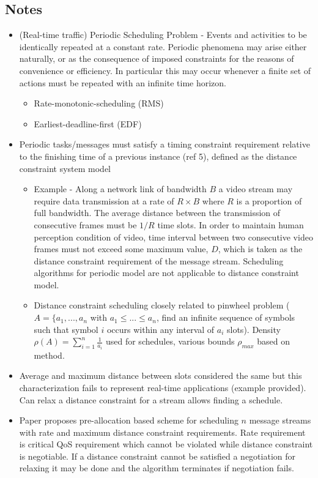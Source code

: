\documentclass{article}
\begin{document}
\subsection{Notes}
\begin{itemize}
    \item (Real-time traffic) Periodic Scheduling Problem - Events and activities to be identically repeated at a constant rate.  Periodic phenomena may arise either naturally, or as the consequence of imposed constraints for the reasons of convenience or efficiency.  In particular this may occur whenever a finite set of actions must be repeated with an infinite time horizon.
    \begin{itemize}
        \item Rate-monotonic-scheduling (RMS)
        \item Earliest-deadline-first (EDF)
    \end{itemize}
    \item Periodic tasks/messages must satisfy a timing constraint requirement relative to the finishing time of a previous instance (ref 5), defined as the distance constraint system model
    \begin{itemize}
        \item Example - Along a network link of bandwidth $B$ a video stream may require data transmission at a rate of $R \times B$ where $R$ is a proportion of full bandwidth.  The average distance between the transmission of consecutive frames must be $1/R$ time slots.  In order to maintain human perception condition of video, time interval between two consecutive video frames must not exceed some maximum value, $D$, which is taken as the distance constraint requirement of the message stream.  Scheduling algorithms for periodic model are not applicable to distance constraint model.
        \item Distance constraint scheduling closely related to pinwheel problem ($A=\{a_1,...,a_n$ with $a_1 \leq ... \leq a_n$, find an infinite sequence of symbols such that symbol $i$ occurs within any interval of $a_i$ slots).  Density $\rho(A)=\sum_{i=1}^n \frac{1}{a_i}$ used for schedules, various bounds $\rho_{max}$ based on method.
    \end{itemize}
    \item Average and maximum distance between slots considered the same but this characterization fails to represent real-time applications (example provided).  Can relax a distance constraint for a stream allows finding a schedule.
    \item Paper proposes pre-allocation based scheme for scheduling $n$ message streams with rate and maximum distance constraint requirements.  Rate requirement is critical QoS requirement which cannot be violated while distance constraint is negotiable.  If a distance constraint cannot be satisfied a negotiation for relaxing it may be done and the algorithm terminates if negotiation fails.

\end{itemize}
\end{document}
